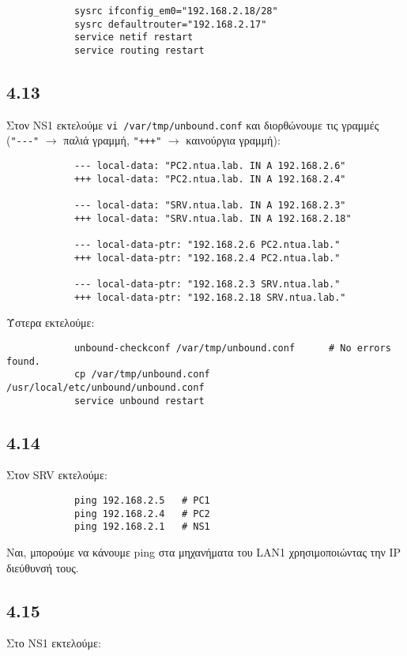 \documentclass[a4paper, 12pt]{article}
\begin{document}
		\begin{verbatim}
			sysrc ifconfig_em0="192.168.2.18/28"
			sysrc defaultrouter="192.168.2.17"
			service netif restart
			service routing restart
		\end{verbatim}

	\subsection*{4.13}
		Στον NS1 εκτελούμε \verb|vi /var/tmp/unbound.conf| και διορθώνουμε τις γραμμές \\ (\verb|"---"| $\rightarrow$ παλιά γραμμή, \verb|"+++"| $\rightarrow$ καινούργια γραμμή):
		
		\begin{verbatim}
			--- local-data: "PC2.ntua.lab. IN A 192.168.2.6"
			+++ local-data: "PC2.ntua.lab. IN A 192.168.2.4"
			
			--- local-data: "SRV.ntua.lab. IN A 192.168.2.3"
			+++ local-data: "SRV.ntua.lab. IN A 192.168.2.18"
			
			--- local-data-ptr: "192.168.2.6 PC2.ntua.lab."
			+++ local-data-ptr: "192.168.2.4 PC2.ntua.lab."
			
			--- local-data-ptr: "192.168.2.3 SRV.ntua.lab."
			+++ local-data-ptr: "192.168.2.18 SRV.ntua.lab."
		\end{verbatim}
		
		Ύστερα εκτελούμε:
		
		\begin{verbatim}
			unbound-checkconf /var/tmp/unbound.conf      # No errors found.
			cp /var/tmp/unbound.conf /usr/local/etc/unbound/unbound.conf
			service unbound restart
		\end{verbatim}

	\subsection*{4.14}
		Στον SRV εκτελούμε:
		
		\begin{verbatim}
			ping 192.168.2.5   # PC1
			ping 192.168.2.4   # PC2 
			ping 192.168.2.1   # NS1
		\end{verbatim}
		
		Ναι, μπορούμε να κάνουμε ping στα μηχανήματα του LAN1 χρησιμοποιώντας την IP διεύθυνσή τους.

	\subsection*{4.15}
		Στο NS1 εκτελούμε:
		
\end{document}
